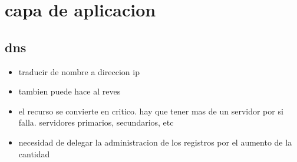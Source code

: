 \documentclass[11pt]{article}
\begin{document}
\section{capa de aplicacion}
\label{sec:orga8cd42f}
\subsection{dns}
\label{sec:org5ce89ee}
\begin{itemize}
\item traducir de nombre a direccion ip
\item tambien puede hace al reves
\item el recurso se convierte en critico. hay que tener mas de un servidor por si falla. servidores primarios, secundarios, etc
\item necesidad de delegar la administracion de los registros por el aumento de la cantidad
\end{itemize}
\end{document}
